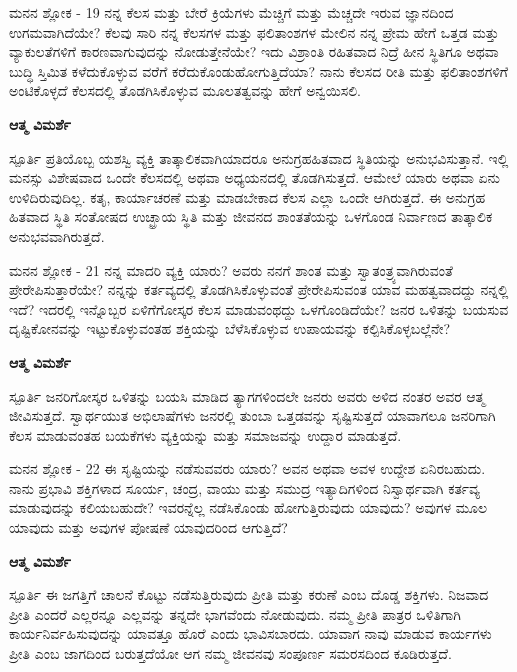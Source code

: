 \begin{mananam}{\mananamfont ಮನನ ಶ್ಲೋಕ - \textenglish{19}}
\footnotesize \mananamtext ನನ್ನ ಕೆಲಸ ಮತ್ತು ಬೇರೆ ಕ್ರಿಯೆಗಳು ಮೆಚ್ಚಿಗೆ ಮತ್ತು ಮೆಚ್ಚದೇ ಇರುವ ಜ್ಞಾನದಿಂದ ಉಗಮವಾಗಿದೆಯೇ? ಕೆಲವು ಸಾರಿ ನನ್ನ ಕೆಲಸಗಳ ಮತ್ತು ಫಲಿತಾಂಶಗಳ ಮೇಲಿನ ನನ್ನ ಪ್ರೇಮ ಹೇಗೆ ಒತ್ತಡ ಮತ್ತು ವ್ಯಾಕುಲತೆಗಳಿಗೆ ಕಾರಣವಾಗುವುದನ್ನು ನೋಡುತ್ತೇನೆಯೇ? ಇದು ವಿಶ್ರಾಂತಿ ರಹಿತವಾದ ನಿದ್ರೆ ಹೀನ ಸ್ಥಿತಿಗೂ ಅಥವಾ ಬುದ್ಧಿ ಸ್ತಿಮಿತ ಕಳೆದುಕೊಳ್ಳುವ ವರೆಗೆ ಕರೆದುಕೊಂಡುಹೋಗುತ್ತಿದೆಯಾ? ನಾನು ಕೆಲಸದ ರೀತಿ ಮತ್ತು ಫಲಿತಾಂಶಗಳಿಗೆ ಅಂಟಿಕೊಳ್ಳದೆ ಕೆಲಸದಲ್ಲಿ ತೊಡಗಿಸಿಕೊಳ್ಳುವ ಮೂಲತತ್ವವನ್ನು ಹೇಗೆ ಅನ್ವಯಿಸಲಿ.
\end{mananam}
\WritingHand\enspace\textbf{ಆತ್ಮ ವಿಮರ್ಶೆ}\\
\begin{inspiration}{\mananamfont ಸ್ಪೂರ್ತಿ}
\footnotesize \mananamtext ಪ್ರತಿಯೊಬ್ಬ ಯಶಸ್ವಿ ವ್ಯಕ್ತಿ ತಾತ್ಕಾಲಿಕವಾಗಿಯಾದರೂ ಅನುಗ್ರಹಹಿತವಾದ ಸ್ಥಿತಿಯನ್ನು ಅನುಭವಿಸುತ್ತಾನೆ. ಇಲ್ಲಿ ಮನಸ್ಸು ವಿಶೇಷವಾದ ಒಂದೇ ಕೆಲಸದಲ್ಲಿ ಅಥವಾ ಅಧ್ಯಯನದಲ್ಲಿ ತೊಡಗಿಸುತ್ತದೆ. ಆಮೇಲೆ ಯಾರು ಅಥವಾ ಏನು ಉಳಿದಿರುವುದಿಲ್ಲ. ಕತೃ, ಕಾರ್ಯಾಚರಣೆ ಮತ್ತು ಮಾಡಬೇಕಾದ ಕೆಲಸ ಎಲ್ಲಾ ಒಂದೇ ಆಗಿರುತ್ತದೆ. ಈ ಅನುಗ್ರಹ ಹಿತವಾದ ಸ್ಥಿತಿ ಸಂತೋಷದ  ಉಚ್ಛ್ರಾಯ ಸ್ಥಿತಿ ಮತ್ತು ಜೀವನದ ಶಾಂತತೆಯನ್ನು ಒಳಗೊಂಡ ನಿರ್ವಾಣದ ತಾತ್ಕಾಲಿಕ ಅನುಭವವಾಗಿರುತ್ತದೆ.
\end{inspiration}
\newpage

\begin{mananam}{\mananamfont ಮನನ ಶ್ಲೋಕ - \textenglish{21}}
\footnotesize \mananamtext ನನ್ನ ಮಾದರಿ ವ್ಯಕ್ತಿ ಯಾರು? ಅವರು ನನಗೆ ಶಾಂತ ಮತ್ತು ಸ್ವಾತಂತ್ರ್ಯವಾಗಿರುವಂತೆ ಪ್ರೇರೇಪಿಸುತ್ತಾರೆಯೇ? ನನ್ನನ್ನು ಕರ್ತವ್ಯದಲ್ಲಿ ತೊಡಗಿಸಿಕೊಳ್ಳುವಂತೆ ಪ್ರೇರೇಪಿಸುವಂತ ಯಾವ ಮಹತ್ವವಾದದ್ದು ನನ್ನಲ್ಲಿ ಇದೆ? ಇದರಲ್ಲಿ ಇನ್ನೊಬ್ಬರ ಏಳಿಗೆಗೋಸ್ಕರ ಕೆಲಸ ಮಾಡುವಂಥದ್ದು ಒಳಗೊಂಡಿದೆಯೇ? ಜನರ ಒಳಿತನ್ನು ಬಯಸುವ ದೃಷ್ಟಿಕೋನವನ್ನು ಇಟ್ಟುಕೊಳ್ಳುವಂತಹ ಶಕ್ತಿಯನ್ನು ಬೆಳೆಸಿಕೊಳ್ಳುವ ಉಪಾಯವನ್ನು ಕಲ್ಪಿಸಿಕೊಳ್ಳಬಲ್ಲೆನೇ?
\end{mananam}
\WritingHand\enspace\textbf{ಆತ್ಮ ವಿಮರ್ಶೆ}\\
\begin{inspiration}{\mananamfont ಸ್ಪೂರ್ತಿ}
\footnotesize \mananamtext ಜನರಿಗೋಸ್ಕರ ಒಳಿತನ್ನು ಬಯಸಿ ಮಾಡಿದ ತ್ಯಾಗಗಳಿಂದಲೇ ಜನರು ಅವರು ಅಳಿದ ನಂತರ ಅವರ ಆತ್ಮ ಜೀವಿಸುತ್ತದೆ. ಸ್ವಾರ್ಥಯುತ ಅಭಿಲಾಷೆಗಳು ಜನರಲ್ಲಿ ತುಂಬಾ ಒತ್ತಡವನ್ನು ಸೃಷ್ಟಿಸುತ್ತದೆ ಯಾವಾಗಲೂ ಜನರಿಗಾಗಿ ಕೆಲಸ ಮಾಡುವಂತಹ ಬಯಕೆಗಳು ವ್ಯಕ್ತಿಯನ್ನು ಮತ್ತು ಸಮಾಜವನ್ನು ಉದ್ದಾರ ಮಾಡುತ್ತದೆ.
\end{inspiration}
\newpage

\begin{mananam}{\mananamfont ಮನನ ಶ್ಲೋಕ - \textenglish{22}}
\footnotesize \mananamtext ಈ ಸೃಷ್ಟಿಯನ್ನು ನಡೆಸುವವರು ಯಾರು? ಅವನ ಅಥವಾ ಅವಳ ಉದ್ದೇಶ ಏನಿರಬಹುದು. ನಾನು ಪ್ರಭಾವಿ ಶಕ್ತಿಗಳಾದ ಸೂರ್ಯ, ಚಂದ್ರ, ವಾಯು ಮತ್ತು ಸಮುದ್ರ ಇತ್ಯಾದಿಗಳಿಂದ ನಿಸ್ವಾರ್ಥವಾಗಿ ಕರ್ತವ್ಯ ಮಾಡುವುದನ್ನು ಕಲಿಯಬಹುದೇ? ಇವರನ್ನೆಲ್ಲ ನಡೆಸಿಕೊಂಡು ಹೋಗುತ್ತಿರುವುದು ಯಾವುದು? ಅವುಗಳ ಮೂಲ ಯಾವುದು ಮತ್ತು ಅವುಗಳ ಪೋಷಣೆ ಯಾವುದರಿಂದ ಆಗುತ್ತಿದೆ?
\end{mananam}
\WritingHand\enspace\textbf{ಆತ್ಮ ವಿಮರ್ಶೆ}\\
\begin{inspiration}{\mananamfont ಸ್ಪೂರ್ತಿ}
\footnotesize \mananamtext ಈ ಜಗತ್ತಿಗೆ ಚಾಲನೆ ಕೊಟ್ಟು ನಡೆಸುತ್ತಿರುವುದು ಪ್ರೀತಿ ಮತ್ತು ಕರುಣೆ ಎಂಬ ದೊಡ್ಡ ಶಕ್ತಿಗಳು. ನಿಜವಾದ ಪ್ರೀತಿ ಎಂದರೆ ಎಲ್ಲರನ್ನೂ ಎಲ್ಲವನ್ನು ತನ್ನದೇ ಭಾಗವೆಂದು ನೋಡುವುದು. ನಮ್ಮ ಪ್ರೀತಿ ಪಾತ್ರರ ಒಳಿತಿಗಾಗಿ ಕಾರ್ಯನಿರ್ವಹಿಸುವುದನ್ನು ಯಾವತ್ತೂ ಹೊರೆ ಎಂದು ಭಾವಿಸಬಾರದು. ಯಾವಾಗ ನಾವು ಮಾಡುವ ಕಾರ್ಯಗಳು ಪ್ರೀತಿ ಎಂಬ ಜಾಗದಿಂದ ಬರುತ್ತದೆಯೋ ಆಗ ನಮ್ಮ ಜೀವನವು ಸಂಪೂರ್ಣ ಸಮರಸದಿಂದ ಕೂಡಿರುತ್ತದೆ.
\end{inspiration}
\newpage


